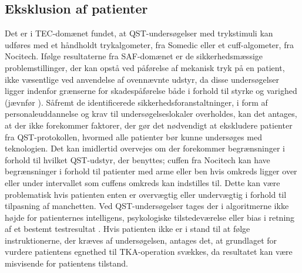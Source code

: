 \subsection{Eksklusion af patienter}
Det er i TEC-domænet fundet, at QST-undersøgelser med trykstimuli kan udføres med et håndholdt trykalgometer, fra Somedic eller et cuff-algometer, fra Nocitech. 
Ifølge resultaterne fra SAF-domænet er de sikkerhedsmæssige problemstillinger, der kan opstå ved påførelse af mekanisk tryk på en patient, ikke væsentlige ved anvendelse af ovennævnte udstyr, da disse undersøgelser ligger indenfor grænserne for skadespåførelse både i forhold til styrke og varighed (jævnfør ). Såfremt de identificerede sikkerhedsforanstaltninger, i form af personaleuddannelse og krav til undersøgelseslokaler overholdes, kan det antages, at der ikke forekommer faktorer, der gør det nødvendigt at ekskludere patienter fra QST-protokollen, hvormed alle patienter bør kunne undersøges med teknologien. Det kan imidlertid overvejes om der forekommer begrænsninger i forhold til hvilket QST-udstyr, der benyttes; cuffen fra Nocitech kan have begrænsninger i forhold til patienter med arme eller ben hvis omkreds ligger over eller under intervallet som cuffens omkreds kan indstilles til. Dette kan være problematisk hvis patienten enten er overvægtig eller undervægtig i forhold til tilpasning af manchetten. Ved QST-undersøgelser tages der i algoritmerne ikke højde for patienternes intelligens, psykologiske tilstedeværelse eller bias i retning af et bestemt testresultat \citep{Dyck1998}.  
Hvis patienten ikke er i stand til at følge instruktionerne, der kræves af undersøgelsen, antages det, at grundlaget for vurdere patientens egnethed til TKA-operation svækkes, da resultatet kan være misvisende for patientens tilstand.

